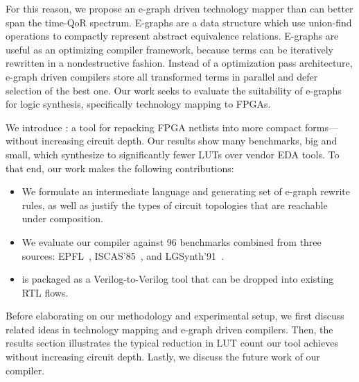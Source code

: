 For this reason, we propose an e-graph driven technology mapper than can better
span the time-QoR spectrum. E-graphs are a data structure which use union-find
operations to compactly represent abstract equivalence relations. E-graphs are
useful as an optimizing compiler framework, because terms can be iteratively
rewritten in a nondestructive fashion. Instead of a optimization pass
architecture, e-graph driven compilers store all transformed terms in parallel
and defer selection of the best one. Our work seeks to evaluate the suitability
of e-graphs for logic synthesis, specifically technology mapping to FPGAs.

We introduce \shortname{}: a tool for repacking FPGA netlists into more compact
forms---without increasing circuit depth. Our results show many benchmarks, big
and small, which synthesize to significantly fewer LUTs over vendor EDA tools.
To that end, our work makes the following contributions:

\begin{itemize}
    \item We formulate an intermediate language and generating set of e-graph rewrite
          rules, as well as justify the types of circuit topologies that are reachable
          under composition.
    \item We evaluate our compiler against 96 benchmarks combined from three sources:
          EPFL~\cite{epflbench}, ISCAS'85~\cite{iscasbench}, and
          LGSynth'91~\cite{lgsynthbench}.
    \item \shortname{} is packaged as a Verilog-to-Verilog tool that can be dropped into existing RTL flows.
\end{itemize}

Before elaborating on our methodology and experimental setup, we first discuss
related ideas in technology mapping and e-graph driven compilers. Then, the
results section illustrates the typical reduction in LUT count our tool
achieves without increasing circuit depth. Lastly, we discuss the future work
of our compiler.
